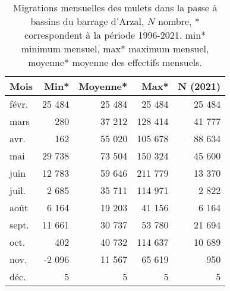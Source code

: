 \begin{table}[htbp]
\centering
\begin{tabular}{lrrrr}
  \hline
Mois & Min* & Moyenne* & Max* & N (2021) \\ 
  \hline
févr. & 25 484 & 25 484 & 25 484 & 25 484 \\ 
  mars & 280 & 37 212 & 128 414 & 41 777 \\ 
  avr. & 162 & 55 020 & 105 678 & 88 634 \\ 
  mai & 29 738 & 73 504 & 150 324 & 45 600 \\ 
  juin & 12 783 & 59 646 & 211 779 & 13 370 \\ 
  juil. & 2 685 & 35 711 & 114 971 & 2 822 \\ 
  août & 6 164 & 19 203 & 41 156 & 6 164 \\ 
  sept. & 11 661 & 30 737 & 53 780 & 21 694 \\ 
  oct. & 402 & 40 732 & 114 637 & 10 689 \\ 
  nov. & -2 096 & 11 567 & 65 619 & 950 \\ 
  déc. & 5 & 5 & 5 & 5 \\ 
   \hline
\end{tabular}
\caption{Migrations mensuelles des mulets dans la passe à bassins du barrage d'Arzal, $N$ nombre, * correspondent à
				la période 1996-2021. min* minimum mensuel, max* maximum mensuel, moyenne* moyenne des effectifs mensuels.} 
\label{table_lpm_mois}
\end{table}
